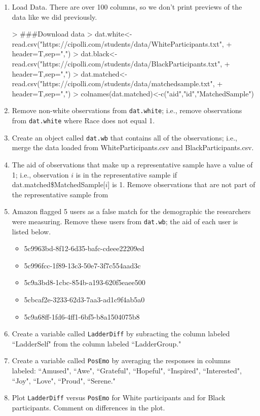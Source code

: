 \documentclass{article}
\begin{document}
\begin{enumerate}
\begin{enumerate}
\item Load Data. There are over 100 columns, so we don't print previews of the data
like we did previously.
\begin{Schunk}
\begin{Sinput}
> ###Download data
> dat.white<-read.csv("https://cipolli.com/students/data/WhiteParticipants.txt",
+ header=T,sep=",")
> dat.black<-read.csv("https://cipolli.com/students/data/BlackParticipants.txt",
+ header=T,sep=",")
> dat.matched<-read.csv("https://cipolli.com/students/data/matchedsample.txt",
+ header=T,sep=",")
> colnames(dat.matched)<-c("aid","id","MatchedSample")
\end{Sinput}
\end{Schunk}
\item Remove non-white observations from \texttt{dat.white}; i.e., remove observations 
from \texttt{dat.white} where Race does not equal 1.
\item Create an object called \texttt{dat.wb} that contains all of the observations;
i.e., merge the data loaded from WhiteParticipants.csv and BlackParticipants.csv.
\item The aid of observations that make up a representative sample have a value of
1; i.e., observation $i$ is in the representative sample if dat.matched\$MatchedSample[$i$]
is 1. Remove observations that are not part of the representative sample from
\item Amazon flagged 5 users as a false match for the demographic the researchers
were measuring. Remove these users from \texttt{dat.wb}; the aid of each user is 
listed below.
\begin{itemize}
  \item 5c9963bd-8f12-6d35-bafc-cdeee22209ed
  \item 5c996fcc-1f89-13c3-50e7-3f7c554aad3c
  \item 5c9a3bd8-1cbc-854b-a193-620f5eaee500
  \item 5cbcaf2e-3233-62d3-7aa3-ad1c9f4ab5a0
  \item 5c9a68ff-1fd6-4ff1-6bf5-b8a1504075b8
\end{itemize}
\item Create a variable called \texttt{LadderDiff} by subracting the column labeled
``LadderSelf" from the column labeled ``LadderGroup."
\item Create a variable called \texttt{PosEmo} by averaging the responses in columns
labeled: ``Amused", ``Awe", ``Grateful", ``Hopeful", ``Inspired", ``Interested",
 ``Joy", ``Love", ``Proud", ``Serene."
 \item Plot \texttt{LadderDiff} versus \texttt{PosEmo} for White participants
 and for Black participants. Comment on differences in the plot.
\end{enumerate}


\end{enumerate}
\end{document}
